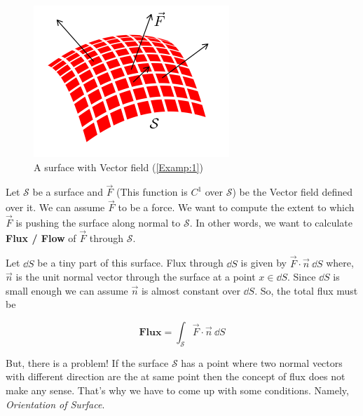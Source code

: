 \documentclass[../Analysis-3]{subfiles}
\begin{document}
\begin{tcolorbox} \label{Examp:1}

    \begin{figure}
        \centering
        \includegraphics[width=.78\linewidth]{../figures/lec-26.3.png}
        \caption{A surface with Vector field (\ref{Examp:1})}
    \end{figure}

    Let $\mathcal{S}$ be a surface and $\vec{F}$ (This function is $C^1$ over $\mathcal{S}$) be the Vector field defined over it. We can assume $\vec{F}$ to be a force. We want to compute the extent to which $\vec{F}$ is pushing the surface along normal to $\mathcal{S}$. In other words, we want to calculate \textbf{Flux / Flow} of $\vec{F}$ through $\mathcal{S}$.

    \vspace{0.2cm}

    Let $\dd S$ be a tiny part of  this surface. Flux through $\dd S$ is given by $\vec{F}\cdot\vec{n}\ \dd S$ where, $\vec{n}$ is the unit normal vector through the surface at a point $x \in \dd S$. Since $\dd S$ is small enough we can assume $\vec{n}$ is almost constant over $\dd S$. So, the total flux must be

    \[ \textbf{Flux} = \int_{\mathcal{S}} \vec{F}\cdot\vec{n}\ \dd S \]

    But, there is a problem! If the surface $\mathcal{S}$ has a point where two normal vectors with different direction are the at same point then the concept of flux does not make any sense. That's why we have to come up with some conditions. Namely, \textit{Orientation of Surface}.

\end{tcolorbox}
\end{document}
